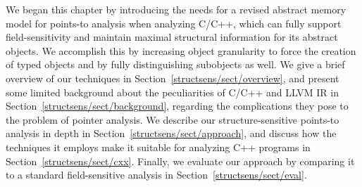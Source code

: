 We began this chapter by introducing the needs for a revised abstract
memory model for points-to analysis when analyzing C/C++, which can
fully support field-sensitivity and maintain maximal structural
information for its abstract objects. We accomplish this by increasing
object granularity to force the creation of typed objects and by fully
distinguishing subobjects as well. We give a brief overview of our
techniques in Section~\ref{structsens/sect/overview}, and present some
limited background about the peculiarities of C/C++ and LLVM IR in
Section~\ref{structsens/sect/background}, regarding the complications
they pose to the problem of pointer analysis. We describe our
structure-sensitive points-to analysis in depth in
Section~\ref{structsens/sect/approach}, and discuss how the techniques
it employs make it suitable for analyzing C++ programs in
Section~\ref{structsens/sect/cxx}. Finally, we evaluate our approach
by comparing it to a standard field-sensitive analysis in
Section~\ref{structsens/sect/eval}.












